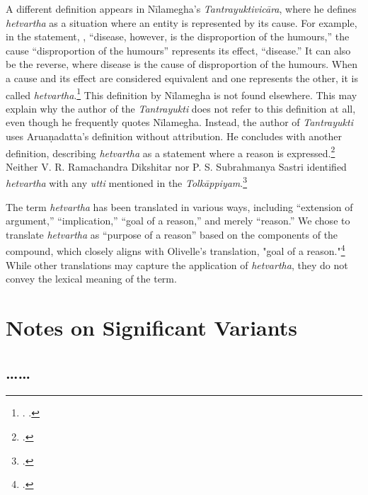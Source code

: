 A different definition appears in Nīlamegha's \emph{Tantrayuktivicāra}, 
where he defines \emph{hetvartha} as a situation 
where an entity is represented by its cause. 
For example, in the statement, , 
“disease, however, is the disproportion of the humours,” 
the cause “disproportion of the humours” represents its effect, “disease.” 
It can also be the reverse, 
where disease is the cause of disproportion of the humours. 
When a cause and its effect are considered equivalent 
and one represents the other, it is called \emph{hetvartha}.\footnote{%
	\begin{verse}
	\end{verse}
	. 
		\cite[4]{muth-1976}.} 
This definition by Nīlamegha is not found elsewhere. 
This may explain why the author of the \emph{Tantrayukti} 
does not refer to this definition at all, 
even though he frequently quotes Nīlamegha. 
Instead, the author of \emph{Tantrayukti} 
uses Aruaṇadatta's definition without attribution. 
He concludes with another definition, describing \emph{hetvartha} as a statement 
where a reason is expressed.\footnote{%
	\begin{verse}
	\end{verse}
	\cite[8]{nara-1949}.} 
Neither V. R. Ramachandra Dikshitar nor P. S. Subrahmanya Sastri 
identified \emph{hetvartha} with any \emph{utti} 
mentioned in the \emph{Tolkāppiyam}.\footcite[84]{chev-2009} 

The term \emph{hetvartha} has been translated in various ways, 
including “extension of argument,” “implication,” 
“goal of a reason,” and merely “reason.” 
We chose to translate \emph{hetvartha} as “purpose of a reason” 
based on the components of the compound, 
which closely aligns with Olivelle’s translation,
"goal of a reason."\footcite[436]{oliv-2013}
While other translations may capture the application of \emph{hetvartha}, 
they do not convey the lexical meaning of the term.

\section{Notes on Significant Variants}

\subsection{\ldots{}\ldots}\label{yogan1}
	
